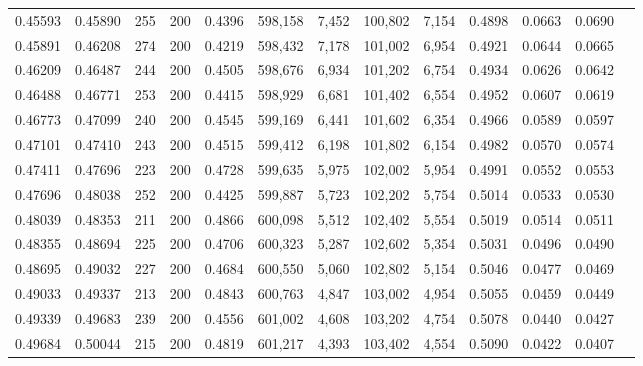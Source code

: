 \begin{tabular}{rrrrrrrrrrrrr}
0.45593 & 0.45890 &   255 & 200 &                                     0.4396 & 598,158 &   7,452 & 100,802 &   7,154 & 0.4898 & 0.0663 & 0.0690 \\
0.45891 & 0.46208 &   274 & 200 &                                     0.4219 & 598,432 &   7,178 & 101,002 &   6,954 & 0.4921 & 0.0644 & 0.0665 \\
0.46209 & 0.46487 &   244 & 200 &                                     0.4505 & 598,676 &   6,934 & 101,202 &   6,754 & 0.4934 & 0.0626 & 0.0642 \\
0.46488 & 0.46771 &   253 & 200 &                                     0.4415 & 598,929 &   6,681 & 101,402 &   6,554 & 0.4952 & 0.0607 & 0.0619 \\
0.46773 & 0.47099 &   240 & 200 &                                     0.4545 & 599,169 &   6,441 & 101,602 &   6,354 & 0.4966 & 0.0589 & 0.0597 \\
0.47101 & 0.47410 &   243 & 200 &                                     0.4515 & 599,412 &   6,198 & 101,802 &   6,154 & 0.4982 & 0.0570 & 0.0574 \\
0.47411 & 0.47696 &   223 & 200 &                                     0.4728 & 599,635 &   5,975 & 102,002 &   5,954 & 0.4991 & 0.0552 & 0.0553 \\
0.47696 & 0.48038 &   252 & 200 &                                     0.4425 & 599,887 &   5,723 & 102,202 &   5,754 & 0.5014 & 0.0533 & 0.0530 \\
0.48039 & 0.48353 &   211 & 200 &                                     0.4866 & 600,098 &   5,512 & 102,402 &   5,554 & 0.5019 & 0.0514 & 0.0511 \\
0.48355 & 0.48694 &   225 & 200 &                                     0.4706 & 600,323 &   5,287 & 102,602 &   5,354 & 0.5031 & 0.0496 & 0.0490 \\
0.48695 & 0.49032 &   227 & 200 &                                     0.4684 & 600,550 &   5,060 & 102,802 &   5,154 & 0.5046 & 0.0477 & 0.0469 \\
0.49033 & 0.49337 &   213 & 200 &                                     0.4843 & 600,763 &   4,847 & 103,002 &   4,954 & 0.5055 & 0.0459 & 0.0449 \\
0.49339 & 0.49683 &   239 & 200 &                                     0.4556 & 601,002 &   4,608 & 103,202 &   4,754 & 0.5078 & 0.0440 & 0.0427 \\
0.49684 & 0.50044 &   215 & 200 &                                     0.4819 & 601,217 &   4,393 & 103,402 &   4,554 & 0.5090 & 0.0422 & 0.0407 \\

\end{tabular}
